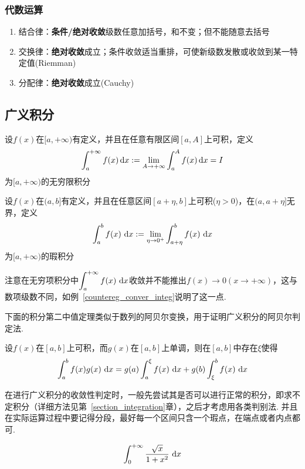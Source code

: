 \subsubsection{代数运算}
\begin{enumerate}
	\item 结合律：\textbf{条件/绝对收敛}级数任意加括号，和不变；但不能随意去括号
	\item 交换律：\textbf{绝对收敛}成立；条件收敛适当重排，可使新级数发散或收敛到某一特定值(Riemman)
	\item 分配律：\textbf{绝对收敛}成立(Cauchy)
\end{enumerate}


\subsection{广义积分}
\begin{definition}[无穷限积分]
设$f(x)$在$[a,+\infty)$有定义，并且在任意有限区间$[a,A]$上可积，定义
\[\int_a^{+\infty}f(x)\,\mathrm{d} x:=\lim_{A\to+\infty}\int_a^Af(x)\,\mathrm{d} x=I\]
为$[a,+\infty)$的无穷限积分
\end{definition}
\begin{definition}[瑕积分]
设$f(x)$在$(a,b]$有定义，并且在任意区间$[a+\eta,b]$上可积($\eta>0$)，在$(a,a+\eta]$无界，定义
\[\displaystyle\int_{a}^{b}{f(x)}\,\,\mathrm{d} x:=\lim_{\eta\to0^+}\displaystyle\int_{a+\eta}^{b}{f(x)}\,\,\mathrm{d} x\]
为$[a,+\infty)$的瑕积分
\end{definition}
\par 注意在无穷项积分中$\displaystyle\int_{a}^{+\infty}{f(x)}\,\,\mathrm{d} x$收敛并不能推出$f(x)\to0(x\to+\infty)$，这与数项级数不同，如例~\ref{countereg_conver_integ}说明了这一点.
\par 下面的积分第二中值定理类似于数列的阿贝尔变换，用于证明广义积分的阿贝尔判定法.
\begin{theorem}[积分第二中值定理]
设$f(x)$在$[a,b]$上可积，而$g(x)$在$[a,b]$上单调，则在$[a,b]$中存在$\xi$使得
\[\displaystyle\int_{a}^{b}{f(x)g(x)}\,\,\mathrm{d} x=g(a)\displaystyle\int_{a}^{\xi}{f(x)}\,\,\mathrm{d} x+g(b)\displaystyle\int_{\xi}^{b}{f(x)}\,\,\mathrm{d} x\]
\end{theorem}
\par 在进行广义积分的收敛性判定时，一般先尝试其是否可以进行正常的积分，即求不定积分（详细方法见第~\ref{section_integration}章），之后才考虑用各类判别法. 并且在实际运算过程中要记得分段，最好每一个区间只含一个瑕点，在端点或者内点都可.
\begin{example}
\[\displaystyle\int_{0}^{+\infty}{\dfrac{\sqrt{x}}{1+x^2}}\,\,\mathrm{d} x\]
\end{example}
